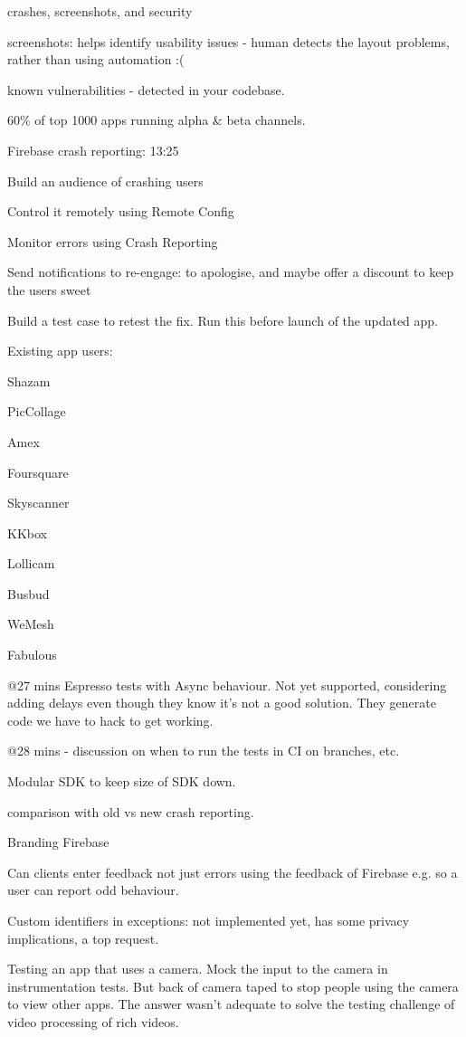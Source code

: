 crashes, screenshots, and security

screenshots: helps identify usability issues - human detects the layout problems, rather than using automation :(

known vulnerabilities - detected in your codebase. 

60\% of top 1000 apps running alpha & beta channels.

Firebase crash reporting: 13:25  

Build an audience of crashing users

Control it remotely using Remote Config

Monitor errors using Crash Reporting

Send notifications to re-engage: to apologise, and maybe offer a discount to keep the users sweet

Build a test case to retest the fix. Run this before launch of the updated app.

Existing app users:

Shazam

PicCollage

Amex

Foursquare

Skyscanner

KKbox

Lollicam

Busbud

WeMesh

Fabulous

@27 mins Espresso tests with Async behaviour. Not yet supported, considering adding delays even though they know it’s not a good solution. They generate code we have to hack to get working.

@28 mins - discussion on when to run the tests in CI on branches, etc.

Modular SDK to keep size of SDK down.

comparison with old vs new crash reporting. 

Branding Firebase

Can clients enter feedback not just errors using the feedback of Firebase e.g. so a user can report odd behaviour.

Custom identifiers in exceptions: not implemented yet, has some privacy implications, a top request.

Testing an app that uses a camera. Mock the input to the camera in instrumentation tests. But back of camera taped to stop people using the camera to view other apps. The answer wasn’t adequate to solve the testing challenge of video processing of rich videos.

